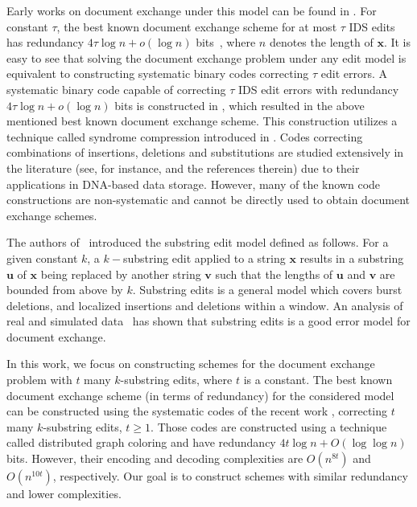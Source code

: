 \documentclass[onecolumn]{IEEEtran}
\newcommand{\bl}{n}
\newcommand{\numedits}{t}
\newcommand{\insdel}{IDS\xspace}
\begin{document}
Early works on document exchange under this model can be found in \cite{Dx_early_1, Dx_early_2, Dx_early_3, Dx_early_4, Dx_early_5, Ramachandran_docex}. 
For constant $\tau$, the best known  
document exchange scheme for at most $\tau$ \insdel edits has redundancy  $4\tau\log\bl + o(\log\bl)$ bits~\cite{Sima_optimal_t_del_code}, where $n$ denotes the length of $\mathbf{x}$.  It is easy to see that solving the document exchange problem under any edit model is equivalent to constructing systematic binary codes correcting $\tau$ edit errors. 
A systematic binary code capable of correcting $\tau$ \insdel edit errors with redundancy $4\tau\log\bl + o(\log\bl)$ bits is constructed in \cite{Sima_optimal_t_del_code}, which resulted in the above mentioned best known document exchange scheme.  
This construction utilizes a technique called syndrome compression introduced in \cite{Sima_Syndrome_compression}. Codes correcting combinations of insertions, deletions and substitutions are studied extensively in the literature (see, for instance, \cite{Guruswami_Two_del_exist_bound, Andreas_Nikita, Rawad_Serge, Antonia_Eitan, Song_Systematic_mult_del_sub_(precoding), Ye_Two_burst_excactly_b_deletion, new_1,new_2, new_3, new_4, new_5} and the references therein) due to their applications in DNA-based data storage. 
However, many of the known code constructions are non-systematic and cannot be directly used to obtain document exchange schemes. 

The authors of~\cite{Tang_substring} introduced the substring edit model defined as follows. For a given constant $k$, a $k-$substring edit applied to a string $\mathbf{x}$ results in a substring $\mathbf{u}$ of $\mathbf{x}$ being replaced by another string $\mathbf{v}$ such that the lengths of $\mathbf{u}$ and $\mathbf{v}$ are bounded from above by $k$. Substring edits is a general model which covers burst deletions, and localized insertions and deletions within a window. An analysis of real and simulated data~\cite{Tang_substring} has shown that substring edits is a good error model for document exchange.

In this work, we focus on constructing schemes for the document exchange problem with $t$ many $k$-substring edits, where $t$ is a constant. The best known document exchange scheme (in terms of redundancy) for the considered model can be constructed using the systematic codes of the recent work \cite{Li_Distributed_graph_coloring}, correcting $t$ many $k$-substring edits, $t\geq 1$. Those codes are constructed using a technique called distributed graph coloring and have redundancy $4\numedits\log\bl + O(\log\log\bl)$ bits. However, their encoding and decoding complexities are $O(n^{8t})$ and $O(n^{10t})$, respectively. Our goal is to construct schemes with similar redundancy and lower complexities.
\end{document}
